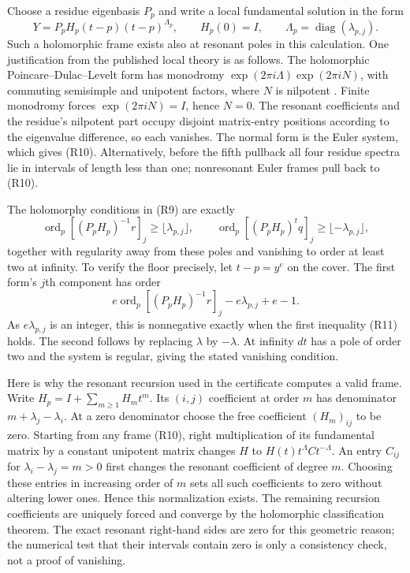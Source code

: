 Choose a residue eigenbasis $P_p$ and write a local fundamental
solution in the form
\[
Y=P_pH_p(t-p)(t-p)^{\Lambda_p},\qquad H_p(0)=I,
\qquad \Lambda_p=\operatorname{diag}(\lambda_{p,j}).
\tag{R10}
\]
Such a holomorphic frame exists also at resonant poles in this
calculation. One justification from the published local theory is
as follows. The holomorphic Poincare--Dulac--Levelt form has
monodromy $\exp(2\pi i\Lambda)\exp(2\pi iN)$, with commuting
semisimple and unipotent factors, where $N$ is nilpotent
\cite[Theorems 16.15--16.16 and Corollary 16.19,
author extract pp.~270--274]{IM:IlyashenkoYakovenko}.
Finite monodromy forces $\exp(2\pi iN)=I$, hence $N=0$.
The resonant coefficients and the residue's nilpotent part occupy
disjoint matrix-entry positions according to the eigenvalue
difference, so each vanishes. The normal form is the Euler system,
which gives (R10). Alternatively, before the fifth pullback all
four residue spectra lie in intervals of length less than one;
nonresonant Euler frames pull back to (R10).

The holomorphy conditions in (R9) are exactly
\[
\operatorname{ord}_p[(P_pH_p)^{-1}r]_j\ge\lfloor\lambda_{p,j}\rfloor,
\qquad
\operatorname{ord}_p[(P_pH_p)^tq]_j\ge\lfloor-\lambda_{p,j}\rfloor,
\tag{R11}
\]
together with regularity away from these poles and vanishing to
order at least two at infinity. To verify the floor precisely, let
$t-p=y^e$ on the cover. The first form's $j$th component has order
\[
e\operatorname{ord}_p[(P_pH_p)^{-1}r]_j
                    -e\lambda_{p,j}+e-1.
\]
As $e\lambda_{p,j}$ is an integer, this is nonnegative exactly when
the first inequality (R11) holds. The second follows by replacing
$\lambda$ by $-\lambda$. At infinity $dt$ has a pole of order two
and the system is regular, giving the stated vanishing condition.

Here is why the resonant recursion used in the certificate computes
a valid frame. Write $H_p=I+\sum_{m\ge1}H_mt^m$. Its $(i,j)$
coefficient at order $m$ has denominator
$m+\lambda_j-\lambda_i$. At a zero denominator choose the free
coefficient $(H_m)_{ij}$ to be zero. Starting from any frame (R10),
right multiplication of its fundamental matrix by a constant
unipotent matrix changes $H$ to
$H(t)t^\Lambda C t^{-\Lambda}$. An entry $C_{ij}$ for
$\lambda_i-\lambda_j=m>0$ first changes the resonant coefficient
of degree $m$. Choosing these entries in increasing order of $m$
sets all such coefficients to zero without altering lower ones.
Hence this normalization exists. The remaining recursion coefficients
are uniquely forced and converge by the holomorphic classification
theorem. The exact resonant right-hand sides are zero for this
geometric reason; the numerical test that their intervals contain
zero is only a consistency check, not a proof of vanishing.

